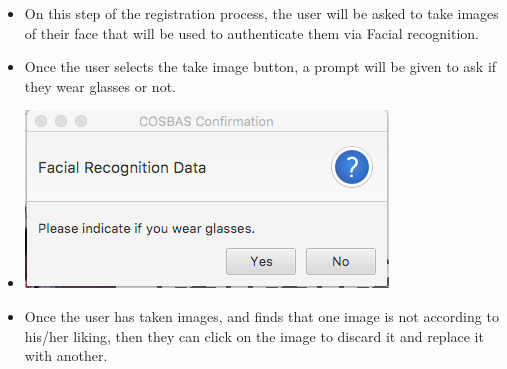 \begin{itemize}
\begin{itemize}
\begin{itemize}
					\item On this step of the registration process, the user will be asked to take images of their face that will be used to authenticate them via Facial recognition.
					\item Once the user selects the take image button, a prompt will be given to ask if they wear glasses or not.
					\item \includegraphics[width=\linewidth]{images/Screenshots/Registration/Reg_Glasses.png}
					\item Once the user has taken images, and finds that one image is not according to his/her liking, then they can click on the image to discard it and replace it with another.
				\end{itemize}
				

\end{itemize}
\end{itemize}
